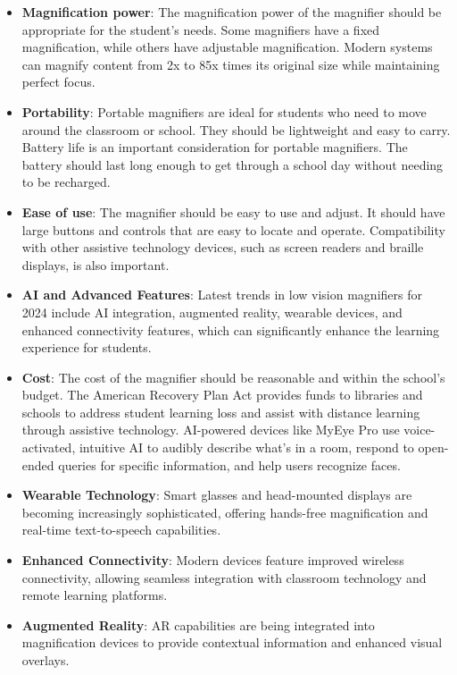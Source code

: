 \begin{itemize}

 \item \textbf{Magnification power}: The magnification power of the magnifier should be appropriate for the student's needs. Some magnifiers have a fixed magnification, while others have adjustable magnification. Modern systems can magnify content from 2x to 85x times its original size while maintaining perfect focus.

 \item \textbf{Portability}: Portable magnifiers are ideal for students who need to move around the classroom or school. They should be lightweight and easy to carry. Battery life is an important consideration for portable magnifiers. The battery should last long enough to get through a school day without needing to be recharged.

 \item \textbf{Ease of use}: The magnifier should be easy to use and adjust. It should have large buttons and controls that are easy to locate and operate. Compatibility with other assistive technology devices, such as screen readers and braille displays, is also important.

 \item \textbf{AI and Advanced Features}: Latest trends in low vision magnifiers for 2024 include AI integration, augmented reality, wearable devices, and enhanced connectivity features, which can significantly enhance the learning experience for students.

 \item \textbf{Cost}: The cost of the magnifier should be reasonable and within the school's budget. The American Recovery Plan Act provides funds to libraries and schools to address student learning loss and assist with distance learning through assistive technology. AI-powered devices like MyEye Pro use voice-activated, intuitive AI to audibly describe what's in a room, respond to open-ended queries for specific information, and help users recognize faces.

 \item \textbf{Wearable Technology}: Smart glasses and head-mounted displays are becoming increasingly sophisticated, offering hands-free magnification and real-time text-to-speech capabilities.

 \item \textbf{Enhanced Connectivity}: Modern devices feature improved wireless connectivity, allowing seamless integration with classroom technology and remote learning platforms.

 \item \textbf{Augmented Reality}: AR capabilities are being integrated into magnification devices to provide contextual information and enhanced visual overlays.

\end{itemize}

